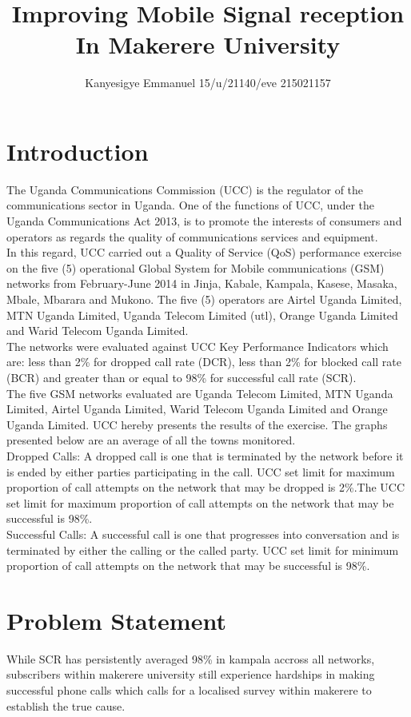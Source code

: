 \documentclass[11pt]{article} %
\title{Improving Mobile Signal reception In Makerere University}
\author{Kanyesigye Emmanuel 15/u/21140/eve 215021157}
\date{} %
\begin{document}
\maketitle

\section{Introduction}
The Uganda Communications Commission (UCC) is the regulator of the communications sector in Uganda. One of the functions of UCC, under the Uganda Communications Act 2013, is to promote the interests of consumers and operators as regards the quality of communications services and equipment.\\In this regard, UCC carried out a Quality of Service (QoS) performance exercise on the five (5) operational Global System for Mobile communications (GSM) networks from February-June 2014 in Jinja, Kabale, Kampala, Kasese, Masaka, Mbale, Mbarara and Mukono. The five (5) operators are Airtel Uganda Limited, MTN Uganda Limited, Uganda Telecom Limited (utl), Orange Uganda Limited and Warid Telecom Uganda Limited.\\The networks were evaluated against UCC Key Performance Indicators which are: less than 2\% for dropped call rate (DCR), less than 2\% for blocked call rate (BCR) and greater than or equal to 98\% for successful call rate (SCR). \\The five GSM networks evaluated are Uganda Telecom Limited, MTN Uganda Limited, Airtel Uganda Limited, Warid Telecom Uganda Limited and Orange Uganda Limited. UCC hereby presents the results of the exercise. The graphs presented below are an average of all the towns monitored.\\
Dropped Calls: A dropped call is one that is terminated by the network before it is ended by either parties participating in the call. UCC set limit for maximum proportion of call attempts on the network that may be dropped is 2\%.The UCC set limit for maximum proportion of call attempts on the network that may be successful is 98\%.\\
Successful Calls: A successful call is one that progresses into conversation and is terminated by either the calling or the called party. UCC set limit for minimum proportion of call attempts on the network that may be successful is 98\%.

\section{Problem Statement}
While SCR has persistently averaged 98\% in kampala accross all networks, subscribers within makerere university still experience hardships in making successful phone calls which calls for a localised survey within makerere to establish the true cause.
\end{document}
